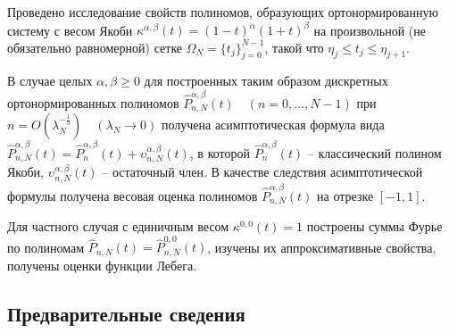 


Проведено исследование свойств полиномов, образующих ортонормированную систему с весом Якоби $\kappa^{\alpha,\beta}(t) = (1-t)^\alpha (1+t)^\beta$ на произвольной (не обязательно равномерной) сетке $\Omega_N = \{ t_j \}_{j=0}^{N-1}$, такой что $\eta_{j}\leq t_{j} \leq \eta_{j+1}$.

В случае целых $\alpha,\beta \geq 0$ для построенных таким образом дискретных ортонормированных полиномов $\hat{P}_{n,N}^{\alpha,\beta}(t)\quad (n=0,\ldots, N-1)$ при $n=O(\lambda_N^{-\frac13}) \quad (\lambda_N \rightarrow 0)$ получена асимптотическая формула вида $\hat{P}_{n,N}^{\alpha,\beta}(t) = \hat{P}_{n}^{\alpha,\beta}(t) + \upsilon_{n,N}^{\alpha,\beta}(t)$, в которой $\hat{P}_{n}^{\alpha,\beta}(t)$ -- классический полином Якоби, $\upsilon_{n,N}^{\alpha,\beta}(t)$ -- остаточный член. В качестве следствия асимптотической формулы получена весовая оценка полиномов $\hat{P}_{n,N}^{\alpha,\beta}(t)$ на отрезке $[-1, 1]$.

Для частного случая с единичным весом  $\kappa^{0,0}(t) = 1$ построены суммы Фурье по полиномам $\hat{P}_{n,N}(t) = \hat{P}_{n,N}^{0,0}(t)$, изучены их аппроксимативные свойства, получены оценки функции Лебега.


\subsection{Предварительные сведения}


